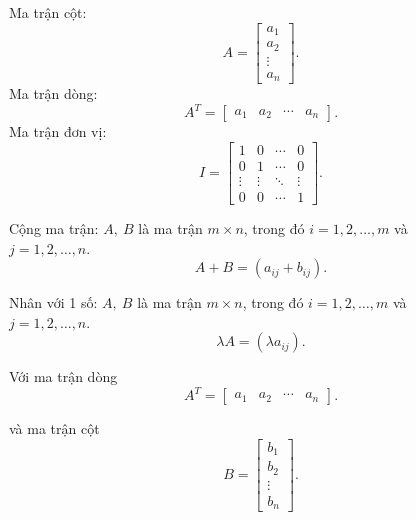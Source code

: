 \documentclass[12pt,a4paper]{report}
\begin{document}
 Ma trận cột:
\begin{equation*}
A = \begin{bmatrix}
        a_1 \\
        a_2 \\
        \vdots \\
        a_n
	\end{bmatrix}.
\end{equation*}
 Ma trận dòng:
\begin{equation*}
A^T = \begin{bmatrix}
	a_1 & a_2 & \cdots & a_n
	\end{bmatrix}.
\end{equation*}
 Ma trận đơn vị:
\begin{equation*}
I = \begin{bmatrix}
        1 & 0 & \cdots & 0 \\
		0 & 1 & \cdots & 0 \\
		\vdots & \vdots & \ddots & \vdots \\
		0 & 0 & \cdots & 1
	\end{bmatrix}.
\end{equation*}

Cộng ma trận: $A, \: B$ là ma trận $m\times n$, trong đó $i=1,2,\ldots,m$ và \\ $j=1,2,\ldots,n$.
\begin{equation*}
A + B = (a_{ij}+b_{ij}).
\end{equation*}
 
Nhân với 1 số: $A, \: B$ là ma trận $m\times n$, trong đó $i=1,2,\ldots,m$ và \\ $j=1,2,\ldots,n$.
\begin{equation*}
\lambda A = (\lambda a_{ij}).
\end{equation*}


Với ma trận dòng
\begin{equation*}
A^T = \begin{bmatrix}
	a_1 & a_2 & \cdots & a_n
	\end{bmatrix}.
\end{equation*}

và ma trận cột
\begin{equation*}
B = \begin{bmatrix}
        b_1 \\
        b_2 \\
        \vdots \\
        b_n
	\end{bmatrix}.
\end{equation*}
\end{document}
